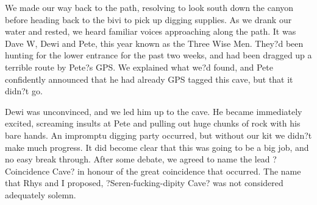     We made our way back to the path, resolving to look south down the canyon before heading back to the bivi to pick up digging supplies. As we drank our water and rested, we heard familiar voices approaching along the path. It was Dave W, Dewi and Pete, this year known as the Three Wise Men. They?d been hunting for the lower entrance for the past two weeks, and had been dragged up a terrible route by Pete?s GPS. We explained what we?d found, and Pete confidently announced that he had already GPS tagged this cave, but that it didn?t go.

    Dewi was unconvinced, and we led him up to the cave. He became immediately excited, screaming insults at Pete and pulling out huge chunks of rock with his bare hands. An impromptu digging party occurred, but without our kit we didn?t make much progress. It did become clear that this was going to be a big job, and no easy break through. After some debate, we agreed to name the lead ?Coincidence Cave? in honour of the great coincidence that occurred. The name that Rhys and I proposed, ?Seren-fucking-dipity Cave? was not considered adequately solemn.

